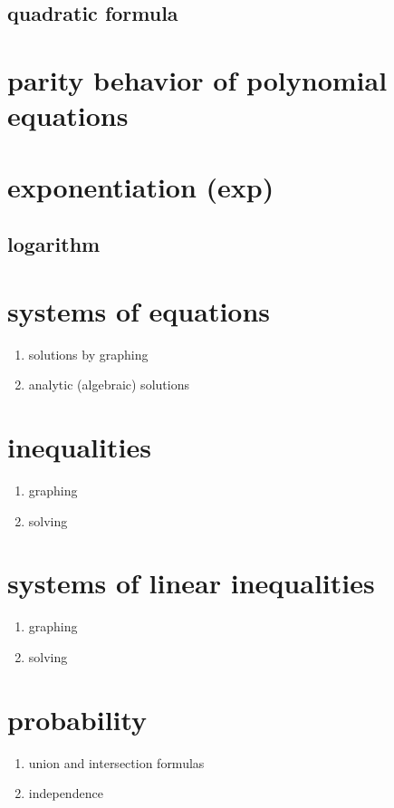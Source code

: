 \documentclass[12pt,paper=letter]{article}
\begin{document}
    \subsection{quadratic formula}


    \section{parity behavior of polynomial equations}


    \section{exponentiation (exp)}

    \subsection{logarithm}


    \section{systems of equations}
    \begin{enumerate}
        \item solutions by graphing
        \item analytic (algebraic) solutions
    \end{enumerate}


    \section{inequalities}
    \begin{enumerate}
        \item graphing
        \item solving
    \end{enumerate}


    \section{systems of linear inequalities}
    \begin{enumerate}
        \item graphing
        \item solving
    \end{enumerate}


    \section{probability}
    \begin{enumerate}
        \item union and intersection formulas
        \item independence
    \end{enumerate}
\end{document}
